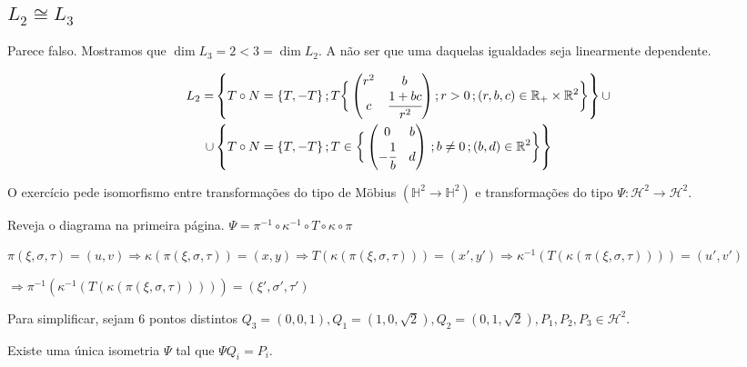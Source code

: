 \documentclass[10pt,a4paper]{article}
\begin{document}
		\subsection{$L_2 \cong L_3$}
		\begin{flushright}
		\end{flushright}

		Parece falso. Mostramos que $\dim L_3 = 2 < 3 = \dim L_2$. A n\~ao ser que uma daquelas igualdades seja linearmente dependente.

		\vspace{3mm}

		\begin{align*}
		L_2 = &\left\{ T \circ N = \{ T, -T \} \,; T \bigg\{ \left( \begin{matrix} r^2 & b \\ c & \cfrac{1+ bc}{r^2} \end{matrix} \right) ; r > 0 \,;(r,b,c) \in \mathbb{R}_+ \times \mathbb{R}^2  \bigg\} \right\} \cup \\
		 \cup &\left \{ T \circ N = \{ T, -T \} \,; T \in \bigg\{ \left( \begin{matrix} 0 & b \\ - \cfrac{1}{b} & d \end{matrix} \right) \,; b \ne 0 \,; (b,d) \in \mathbb{R}^2  \bigg\} \right\}
		\end{align*}

		O exerc\'icio pede isomorfismo entre transforma\c{c}\~oes do tipo de M\"obius $(\mathbb{H}^2 \rightarrow \mathbb{H}^2)$ e transforma\c{c}\~oes do tipo $\Psi : \mathcal{H}^2 \rightarrow \mathcal{H}^2$.

		Reveja o diagrama na primeira p\'agina. $\Psi = \pi^{-1} \circ \kappa^{-1} \circ T \circ \kappa \circ \pi$

		$\pi(\xi, \sigma, \tau) = (u, v) \Rightarrow \kappa(\pi(\xi, \sigma, \tau)) = (x, y) \Rightarrow T(\kappa(\pi(\xi, \sigma, \tau))) = (x', y') \Rightarrow \kappa^{-1}(T(\kappa(\pi(\xi, \sigma, \tau)))) = (u', v')$

		$\Rightarrow \pi^{-1}(\kappa^{-1}(T(\kappa(\pi(\xi, \sigma, \tau))))) = (\xi', \sigma', \tau')$

		\vspace{3mm}

		Para simplificar, sejam 6 pontos distintos $Q_3 = (0,0,1), Q_1 = (1,0,\sqrt 2), Q_2 = (0,1,\sqrt 2), P_1, P_2, P_3 \in \mathcal{H}^2$.

		Existe uma \'unica isometria $\Psi$ tal que $\Psi Q_i = P_i$.
\end{document}
